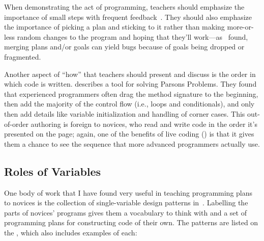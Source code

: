 When demonstrating the act of programming, teachers should emphasize the
importance of small steps with frequent feedback~\cite{Blik2014}.
They should also emphasize the importance of picking a plan and sticking
to it rather than making more-or-less random changes to the program and
hoping that they'll work---as~\cite{Spoh1985} found, merging plans
and/or goals can yield bugs because of goals being dropped or
fragmented.

Another aspect of ``how'' that teachers should present and discuss is the
order in which code is written. \cite{Ihan2011} describes a tool for
solving Parsons Problems. They found that experienced programmers often
drag the method signature to the beginning, then add the majority of the
control flow (i.e., loops and conditionals), and only then add details
like variable initialization and handling of corner cases. This
out-of-order authoring is foreign to novices, who read and write code in
the order it's presented on the page; again, one of the benefits of live
coding () is that it gives them a chance
to see the sequence that more advanced programmers actually use.

\subsection*{Roles of Variables}

One body of work that I have found very useful in teaching programming
plans to novices is the collection of single-variable design patterns
in~\cite{Kuit2004,Byck2005,Saja2006}. Labelling
the parts of novices' programs gives them a vocabulary to think with
and a set of programming plans for constructing code of their own. The
patterns are listed on the , which also includes examples of each:

